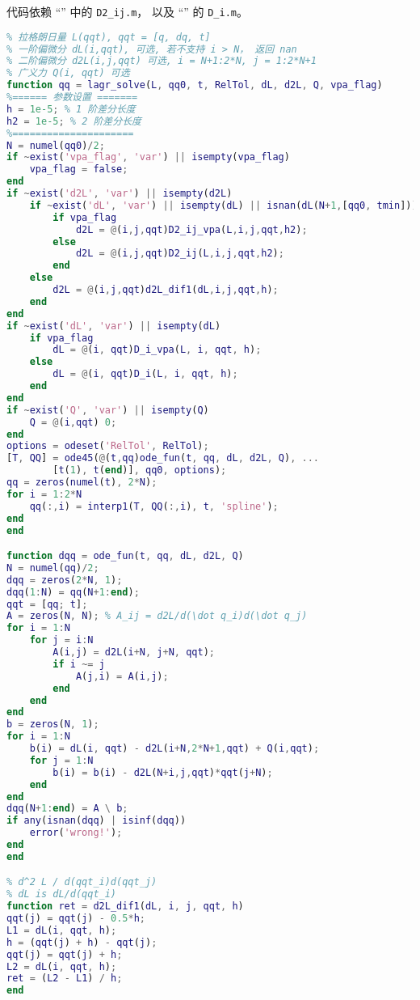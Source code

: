 代码依赖 “” 中的 \verb`D2_ij.m`， 以及 “” 的 \verb`D_i.m`。
\begin{lstlisting}[language=matlab, caption=lagr\_solve.m]
% 数值解拉格朗日方程
% 拉格朗日量 L(qqt), qqt = [q, dq, t]
% 一阶偏微分 dL(i,qqt), 可选, 若不支持 i > N， 返回 nan
% 二阶偏微分 d2L(i,j,qqt) 可选, i = N+1:2*N, j = 1:2*N+1
% 广义力 Q(i, qqt) 可选
function qq = lagr_solve(L, qq0, t, RelTol, dL, d2L, Q, vpa_flag)
%====== 参数设置 =======
h = 1e-5; % 1 阶差分长度
h2 = 1e-5; % 2 阶差分长度
%=====================
N = numel(qq0)/2;
if ~exist('vpa_flag', 'var') || isempty(vpa_flag)
    vpa_flag = false;
end
if ~exist('d2L', 'var') || isempty(d2L)
    if ~exist('dL', 'var') || isempty(dL) || isnan(dL(N+1,[qq0, tmin]))
        if vpa_flag
            d2L = @(i,j,qqt)D2_ij_vpa(L,i,j,qqt,h2);
        else
            d2L = @(i,j,qqt)D2_ij(L,i,j,qqt,h2);
        end
    else
        d2L = @(i,j,qqt)d2L_dif1(dL,i,j,qqt,h);
    end
end
if ~exist('dL', 'var') || isempty(dL)
    if vpa_flag
        dL = @(i, qqt)D_i_vpa(L, i, qqt, h);
    else
        dL = @(i, qqt)D_i(L, i, qqt, h);
    end
end
if ~exist('Q', 'var') || isempty(Q)
    Q = @(i,qqt) 0;
end
options = odeset('RelTol', RelTol);
[T, QQ] = ode45(@(t,qq)ode_fun(t, qq, dL, d2L, Q), ...
        [t(1), t(end)], qq0, options);
qq = zeros(numel(t), 2*N);
for i = 1:2*N
    qq(:,i) = interp1(T, QQ(:,i), t, 'spline');
end
end

function dqq = ode_fun(t, qq, dL, d2L, Q)
N = numel(qq)/2;
dqq = zeros(2*N, 1);
dqq(1:N) = qq(N+1:end);
qqt = [qq; t];
A = zeros(N, N); % A_ij = d2L/d(\dot q_i)d(\dot q_j)
for i = 1:N
    for j = i:N
        A(i,j) = d2L(i+N, j+N, qqt);
        if i ~= j
            A(j,i) = A(i,j);
        end
    end
end
b = zeros(N, 1);
for i = 1:N
    b(i) = dL(i, qqt) - d2L(i+N,2*N+1,qqt) + Q(i,qqt);
    for j = 1:N
        b(i) = b(i) - d2L(N+i,j,qqt)*qqt(j+N);
    end
end
dqq(N+1:end) = A \ b;
if any(isnan(dqq) | isinf(dqq))
    error('wrong!');
end
end

% d^2 L / d(qqt_i)d(qqt_j)
% dL is dL/d(qqt_i)
function ret = d2L_dif1(dL, i, j, qqt, h)
qqt(j) = qqt(j) - 0.5*h;
L1 = dL(i, qqt, h);
h = (qqt(j) + h) - qqt(j);
qqt(j) = qqt(j) + h;
L2 = dL(i, qqt, h);
ret = (L2 - L1) / h;
end
\end{lstlisting}

